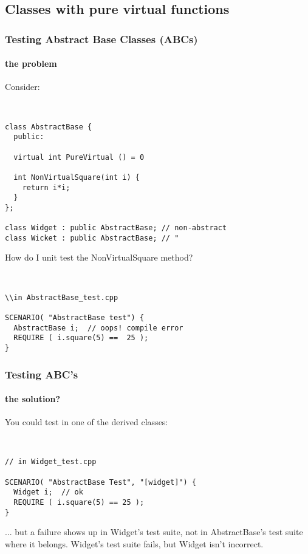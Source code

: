 \subsection{Classes with pure virtual functions}
\begin{frame}[fragile,t]
\frametitle{Testing Abstract Base Classes (ABCs)}
\framesubtitle{the problem}
Consider:
{\scriptsize\
\begin{verbatim}
class AbstractBase {
  public:

  virtual int PureVirtual () = 0

  int NonVirtualSquare(int i) {
    return i*i;
  }
};

class Widget : public AbstractBase; // non-abstract
class Wicket : public AbstractBase; // "
\end{verbatim}}
How do I unit test the NonVirtualSquare method?
{\scriptsize\
\begin{verbatim}
\\in AbstractBase_test.cpp

SCENARIO( "AbstractBase test") {
  AbstractBase i;  // oops! compile error
  REQUIRE ( i.square(5) ==  25 );
}
\end{verbatim}}
\end{frame}
\begin{frame}[fragile,t]
\frametitle{Testing ABC's}
\framesubtitle{the solution?}
You could test in one of the derived classes:
{\scriptsize\
\begin{verbatim}
// in Widget_test.cpp

SCENARIO( "AbstractBase Test", "[widget]") {
  Widget i;  // ok
  REQUIRE ( i.square(5) == 25 );
}
\end{verbatim}}
... but a failure shows up in Widget's test suite, not in
AbstractBase's test suite where it belongs.  Widget's test suite
fails, but Widget isn't incorrect.

\end{frame}


